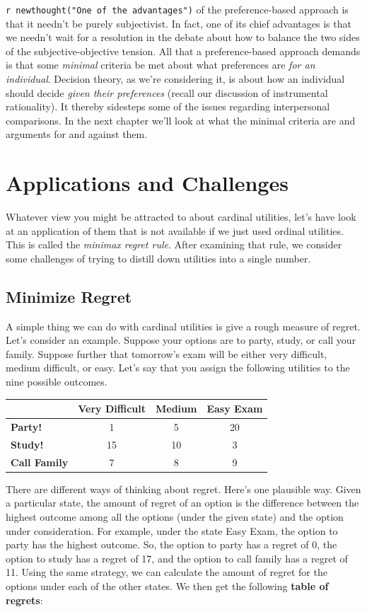 \documentclass[]{tufte-book}
\begin{document}
\texttt{r\ newthought("One\ of\ the\ advantages")} of the preference-based approach is that it needn't be purely subjectivist. In fact, one of its chief advantages is that we needn't wait for a resolution in the debate about how to balance the two sides of the subjective-objective tension. All that a preference-based approach demands is that some \emph{minimal} criteria be met about what preferences are \emph{for an individual}. Decision theory, as we're considering it, is about how an individual should decide \emph{given their preferences} (recall our discussion of instrumental rationality). It thereby sidesteps some of the issues regarding interpersonal comparisons. In the next chapter we'll look at what the minimal criteria are and arguments for and against them.

\hypertarget{applications-and-challenges}{%
\section{Applications and Challenges}\label{applications-and-challenges}}

Whatever view you might be attracted to about cardinal utilities, let's have look at an application of them that is not available if we just used ordinal utilities. This is called the \emph{minimax regret rule}. After examining that rule, we consider some challenges of trying to distill down utilities into a single number.

\hypertarget{minimize-regret}{%
\subsection{Minimize Regret}\label{minimize-regret}}

A simple thing we can do with cardinal utilities is give a rough measure of regret. Let's consider an example. Suppose your options are to party, study, or call your family. Suppose further that tomorrow's exam will be either very difficult, medium difficult, or easy. Let's say that you assign the following utilities to the nine possible outcomes.

\begin{longtable}[]{@{}lccc@{}}
\toprule
& Very Difficult & Medium & Easy Exam\tabularnewline
\midrule
\endhead
\textbf{Party!} & 1 & 5 & 20\tabularnewline
\textbf{Study!} & 15 & 10 & 3\tabularnewline
\textbf{Call Family} & 7 & 8 & 9\tabularnewline
\bottomrule
\end{longtable}

There are different ways of thinking about regret. Here's one plausible way. Given a particular state, the amount of regret of an option is the difference between the highest outcome among all the options (under the given state) and the option under consideration. For example, under the state Easy Exam, the option to party has the highest outcome. So, the option to party has a regret of 0, the option to study has a regret of 17, and the option to call family has a regret of 11. Using the same strategy, we can calculate the amount of regret for the options under each of the other states. We then get the following \textbf{table of regrets}:
\end{document}
